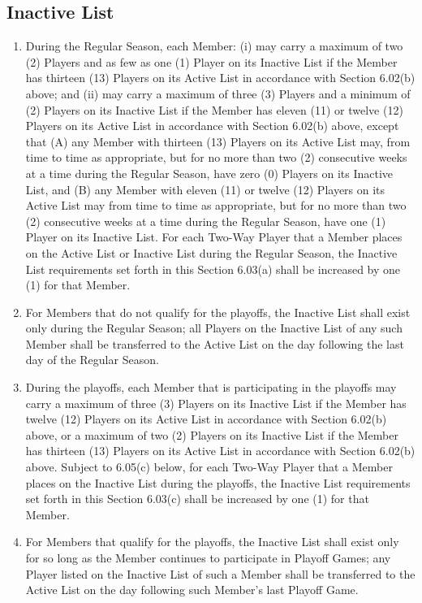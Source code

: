 \documentclass[]{book}
\providecommand{\tightlist}{%
  \setlength{\itemsep}{0pt}\setlength{\parskip}{0pt}}
\begin{document}
\hypertarget{inactive-list}{%
\subsection{Inactive List}\label{inactive-list}}

\begin{enumerate}
\def\labelenumi{(\alph{enumi})}
\tightlist
\item
  During the Regular Season, each Member: (i) may carry a maximum of two (2) Players and as few as one (1) Player on its Inactive List if the Member has thirteen (13) Players on its Active List in accordance with Section 6.02(b) above; and (ii) may carry a maximum of three (3) Players and a minimum of (2) Players on its Inactive List if the Member has eleven (11) or twelve (12) Players on its Active List in accordance with Section 6.02(b) above, except that (A) any Member with thirteen (13) Players on its Active List may, from time to time as appropriate, but for no more than two (2) consecutive weeks at a time during the Regular Season, have zero (0) Players on its Inactive List, and (B) any Member with eleven (11) or twelve (12) Players on its Active List may from time to time as appropriate, but for no more than two (2) consecutive weeks at a time during the Regular Season, have one (1) Player on its Inactive List. For each Two-Way Player that a Member places on the Active List or Inactive List during the Regular Season, the Inactive List requirements set forth in this Section 6.03(a) shall be increased by one (1) for that Member.
\item
  For Members that do not qualify for the playoffs, the Inactive List shall exist only during the Regular Season; all Players on the Inactive List of any such Member shall be transferred to the Active List on the day following the last day of the Regular Season.
\item
  During the playoffs, each Member that is participating in the playoffs may carry a maximum of three (3) Players on its Inactive List if the Member has twelve (12) Players on its Active List in accordance with Section 6.02(b) above, or a maximum of two (2) Players on its Inactive List if the Member has thirteen (13) Players on its Active List in accordance with Section 6.02(b) above. Subject to 6.05(c) below, for each Two-Way Player that a Member places on the Inactive List during the playoffs, the Inactive List requirements set forth in this Section 6.03(c) shall be increased by one (1) for that Member.
\item
  For Members that qualify for the playoffs, the Inactive List shall exist only for so long as the Member continues to participate in Playoff Games; any Player listed on the Inactive List of such a Member shall be transferred to the Active List on the day following such Member's last Playoff Game.
\end{enumerate}
\end{document}
